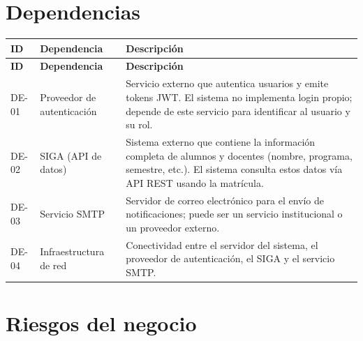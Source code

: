 \documentclass[12pt,letterpaper]{report}
\begin{document}
\section{Dependencias}

\begin{longtable}{|C{1.6cm}|L{4.5cm}|L{7.4cm}|}
    \hline
    \textbf{ID} & \textbf{Dependencia} & \textbf{Descripción} \\
    \hline
    \endfirsthead
    \hline
    \textbf{ID} & \textbf{Dependencia} & \textbf{Descripción} \\
    \hline
    \endhead
    \hline
    \endfoot

    DE-01 & Proveedor de autenticación & Servicio externo que autentica usuarios y emite tokens JWT. El sistema no implementa login propio; depende de este servicio para identificar al usuario y su rol. \\
    \hline
    DE-02 & SIGA (API de datos) & Sistema externo que contiene la información completa de alumnos y docentes (nombre, programa, semestre, etc.). El sistema consulta estos datos vía API REST usando la matrícula. \\
    \hline
    DE-03 & Servicio SMTP & Servidor de correo electrónico para el envío de notificaciones; puede ser un servicio institucional o un proveedor externo. \\
    \hline
    DE-04 & Infraestructura de red & Conectividad entre el servidor del sistema, el proveedor de autenticación, el SIGA y el servicio SMTP. \\
    \hline
\end{longtable}

\section{Riesgos del negocio}
\end{document}
